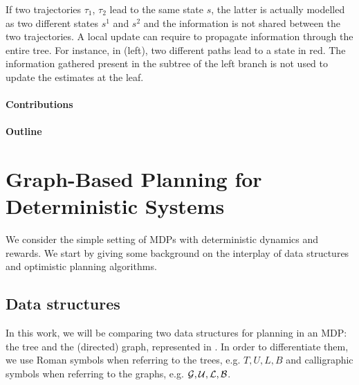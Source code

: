 \documentclass[runningheads]{llncs}
\begin{document}
If two trajectories $\tau_1$, $\tau_2$ lead to the same state $s$, the latter is actually modelled as two different states $s^1$ and $s^2$ and the information is not shared between the two trajectories. A local update can require to propagate information through the entire tree. For instance, in  (left), two different paths lead to a state in red. The information gathered present in the subtree of the left branch is not used to update the estimates at the leaf.

\paragraph{Contributions}

\paragraph{Outline}


\section{Graph-Based Planning for Deterministic Systems}

We consider the simple setting of MDPs with deterministic dynamics and rewards.
We start by giving some background on the interplay of data structures and optimistic planning algorithms.

\subsection{Data structures}

In this work, we will be comparing two data structures for planning in an MDP: the tree and the (directed) graph, represented in . In order to differentiate them, we use Roman symbols when referring to the trees, e.g. $T, U, L, B$ and calligraphic symbols when referring to the graphs, e.g. $\mathcal{G}, \mathcal{U}, \mathcal{L}, \mathcal{B}$.
\end{document}
